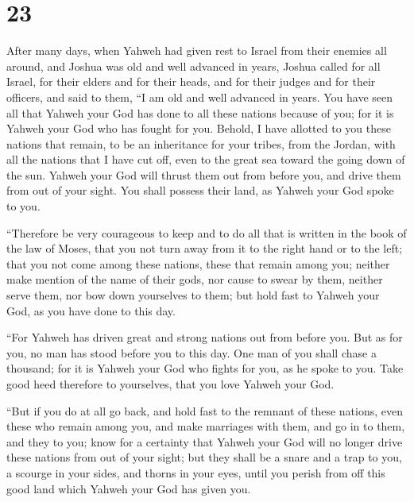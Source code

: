 \hypertarget{section-22}{%
\section{23}\label{section-22}}

 After many days, when Yahweh had given rest to Israel from
their enemies all around, and Joshua was old and well advanced in years,
 Joshua called for all Israel, for their elders and for
their heads, and for their judges and for their officers, and said to
them, ``I am old and well advanced in years.  You have seen
all that Yahweh your God has done to all these nations because of you;
for it is Yahweh your God who has fought for you.  Behold, I
have allotted to you these nations that remain, to be an inheritance for
your tribes, from the Jordan, with all the nations that I have cut off,
even to the great sea toward the going down of the sun. 
Yahweh your God will thrust them out from before you, and drive them
from out of your sight. You shall possess their land, as Yahweh your God
spoke to you.

 ``Therefore be very courageous to keep and to do all that
is written in the book of the law of Moses, that you not turn away from
it to the right hand or to the left;  that you not come
among these nations, these that remain among you; neither make mention
of the name of their gods, nor cause to swear by them, neither serve
them, nor bow down yourselves to them;  but hold fast to
Yahweh your God, as you have done to this day.

 ``For Yahweh has driven great and strong nations out from
before you. But as for you, no man has stood before you to this day.
 One man of you shall chase a thousand; for it is Yahweh
your God who fights for you, as he spoke to you.  Take good
heed therefore to yourselves, that you love Yahweh your God.

 ``But if you do at all go back, and hold fast to the
remnant of these nations, even these who remain among you, and make
marriages with them, and go in to them, and they to you; 
know for a certainty that Yahweh your God will no longer drive these
nations from out of your sight; but they shall be a snare and a trap to
you, a scourge in your sides, and thorns in your eyes, until you perish
from off this good land which Yahweh your God has given you.

